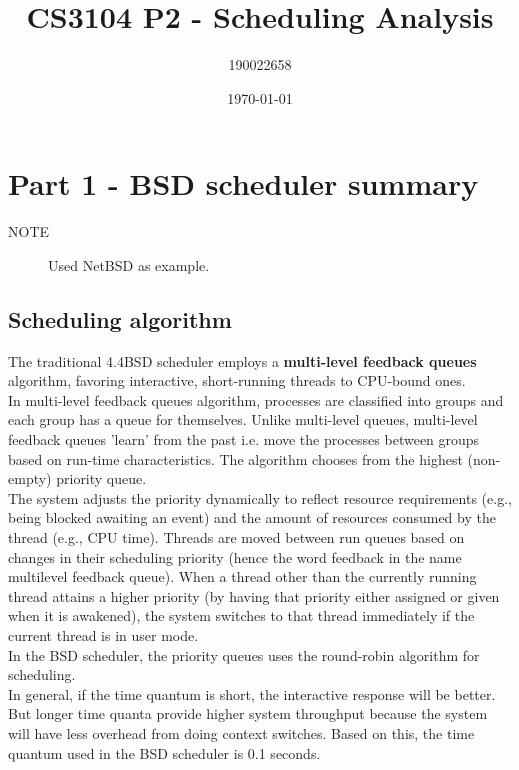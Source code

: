 \documentclass[11pt]{article}
\author{190022658}
\date{\today}
\title{CS3104 P2 - Scheduling Analysis}
\begin{document}
\maketitle

\section{Part 1 - BSD scheduler summary}
\label{sec:orgb21416b}
\begin{description}
\item[{NOTE}] Used NetBSD as example.\\
\end{description}
\subsection{Scheduling algorithm}
\label{sec:orgb4f3a74}
The traditional 4.4BSD scheduler employs a \textbf{multi-level feedback queues} algorithm, favoring interactive, short-running threads to CPU-bound ones.\\

In multi-level feedback queues algorithm, processes are classified into groups and each group has a queue for themselves. Unlike multi-level queues, multi-level feedback queues 'learn' from the past i.e. move the processes between groups based on run-time characteristics. The algorithm chooses from the highest (non-empty) priority queue.\\

The system adjusts the priority dynamically to reflect resource requirements (e.g., being blocked awaiting an event) and the amount of resources consumed by the thread (e.g., CPU time). Threads are moved between run queues based on changes in their scheduling priority (hence the word feedback in the name multilevel feedback queue). When a thread other than the currently running thread attains a higher priority (by having that priority either assigned or given when it is awakened), the system switches to that thread immediately if the current thread is in user mode.\\

In the BSD scheduler, the priority queues uses the round-robin algorithm for scheduling.\\

In general, if the time quantum is short, the interactive response will be better. But longer time quanta provide higher system throughput because the system will have less overhead from doing context switches. Based on this, the time quantum used in the BSD scheduler is 0.1 seconds.\\
\end{document}
